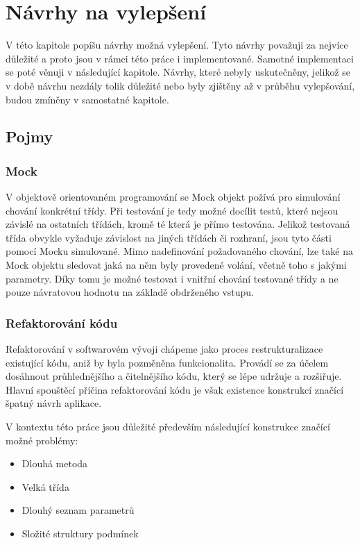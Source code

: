 \documentclass[thesis=B,czech]{FITthesis}[2012/06/26]
\begin{document}
\chapter{Návrhy na vylepšení}
V této kapitole popíšu návrhy možná vylepšení. Tyto návrhy považuji za nejvíce důležité a proto jsou
v rámci této práce i implementované. Samotné implementaci se poté věnuji v následující kapitole. 
Návrhy, které nebyly uskutečněny, jelikož se v době návrhu nezdály tolik důležité nebo byly zjištěny až v průběhu 
vylepšování, budou zmíněny v samostatné kapitole.

\section{Pojmy}

\subsection{Mock}
V objektově orientovaném programování se Mock objekt požívá pro simulování chování konkrétní třídy.\cite{mock}
Při testování je tedy možné docílit testů, které nejsou závislé na ostatních třídách, kromě té která je přímo testována.
Jelikož testovaná třída obvykle vyžaduje závislost na jiných třídách či rozhraní, jsou tyto části pomocí Mocku simulované.
Mimo nadefinování požadovaného chování, lze také na Mock objektu sledovat jaká na něm byly provedené volání, včetně toho
s jakými parametry. Díky tomu je možné testovat i vnitřní chování testované třídy a ne pouze návratovou hodnotu na základě 
obdrženého vstupu.

\subsection{Refaktorování kódu}
Refaktorování v softwarovém vývoji chápeme jako proces restrukturalizace existující kódu, aniž by byla 
pozměněna funkcionalita. Provádí se za účelem dosáhnout průhlednějšího a čitelnějšího kódu, který
se lépe udržuje a rozšiřuje. \cite{refaktoring} Hlavní spouštěcí příčina refaktorování kódu je však existence 
konstrukcí značící špatný návrh aplikace. 

V kontextu této práce jsou důležité především následující konstrukce značící možné problémy: \cite{refaktoring} 
\begin{itemize}
\item Dlouhá metoda
\item Velká třída
\item Dlouhý seznam parametrů
\item Složité struktury podmínek
\end{itemize}
\end{document}
